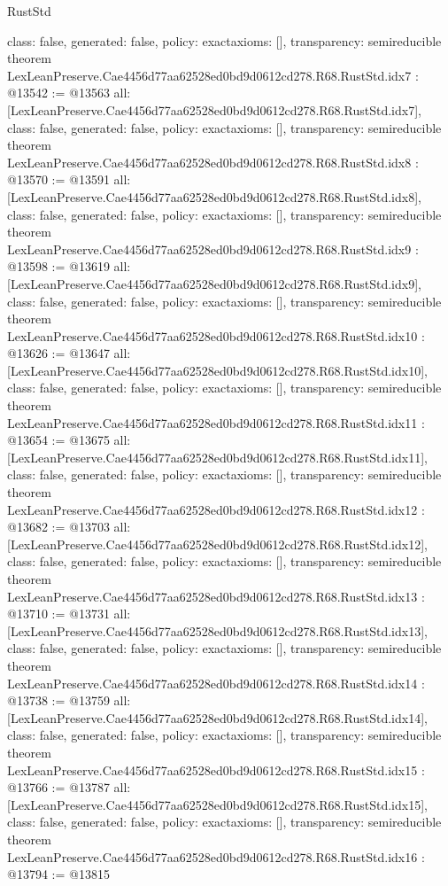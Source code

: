 \begin{lexlean}{RustStd}
\begin{coremodule}
{  class: false,
  generated: false,
  policy: exact{axioms: []},
  transparency: semireducible
}
theorem LexLeanPreserve.Cae4456d77aa62528ed0bd9d0612cd278.R68.RustStd.idx7 : @13542 := @13563 {
  all: [LexLeanPreserve.Cae4456d77aa62528ed0bd9d0612cd278.R68.RustStd.idx7],
  class: false,
  generated: false,
  policy: exact{axioms: []},
  transparency: semireducible
}
theorem LexLeanPreserve.Cae4456d77aa62528ed0bd9d0612cd278.R68.RustStd.idx8 : @13570 := @13591 {
  all: [LexLeanPreserve.Cae4456d77aa62528ed0bd9d0612cd278.R68.RustStd.idx8],
  class: false,
  generated: false,
  policy: exact{axioms: []},
  transparency: semireducible
}
theorem LexLeanPreserve.Cae4456d77aa62528ed0bd9d0612cd278.R68.RustStd.idx9 : @13598 := @13619 {
  all: [LexLeanPreserve.Cae4456d77aa62528ed0bd9d0612cd278.R68.RustStd.idx9],
  class: false,
  generated: false,
  policy: exact{axioms: []},
  transparency: semireducible
}
theorem LexLeanPreserve.Cae4456d77aa62528ed0bd9d0612cd278.R68.RustStd.idx10 : @13626 := @13647 {
  all: [LexLeanPreserve.Cae4456d77aa62528ed0bd9d0612cd278.R68.RustStd.idx10],
  class: false,
  generated: false,
  policy: exact{axioms: []},
  transparency: semireducible
}
theorem LexLeanPreserve.Cae4456d77aa62528ed0bd9d0612cd278.R68.RustStd.idx11 : @13654 := @13675 {
  all: [LexLeanPreserve.Cae4456d77aa62528ed0bd9d0612cd278.R68.RustStd.idx11],
  class: false,
  generated: false,
  policy: exact{axioms: []},
  transparency: semireducible
}
theorem LexLeanPreserve.Cae4456d77aa62528ed0bd9d0612cd278.R68.RustStd.idx12 : @13682 := @13703 {
  all: [LexLeanPreserve.Cae4456d77aa62528ed0bd9d0612cd278.R68.RustStd.idx12],
  class: false,
  generated: false,
  policy: exact{axioms: []},
  transparency: semireducible
}
theorem LexLeanPreserve.Cae4456d77aa62528ed0bd9d0612cd278.R68.RustStd.idx13 : @13710 := @13731 {
  all: [LexLeanPreserve.Cae4456d77aa62528ed0bd9d0612cd278.R68.RustStd.idx13],
  class: false,
  generated: false,
  policy: exact{axioms: []},
  transparency: semireducible
}
theorem LexLeanPreserve.Cae4456d77aa62528ed0bd9d0612cd278.R68.RustStd.idx14 : @13738 := @13759 {
  all: [LexLeanPreserve.Cae4456d77aa62528ed0bd9d0612cd278.R68.RustStd.idx14],
  class: false,
  generated: false,
  policy: exact{axioms: []},
  transparency: semireducible
}
theorem LexLeanPreserve.Cae4456d77aa62528ed0bd9d0612cd278.R68.RustStd.idx15 : @13766 := @13787 {
  all: [LexLeanPreserve.Cae4456d77aa62528ed0bd9d0612cd278.R68.RustStd.idx15],
  class: false,
  generated: false,
  policy: exact{axioms: []},
  transparency: semireducible
}
theorem LexLeanPreserve.Cae4456d77aa62528ed0bd9d0612cd278.R68.RustStd.idx16 : @13794 := @13815 {
}
\end{coremodule}
\end{lexlean}

